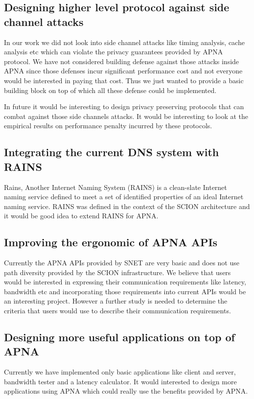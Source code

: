 \subsection{Designing higher level protocol against side channel attacks}
In our work we did not look into side channel attacks like timing analysis, cache analysis etc which can violate the privacy guarantees provided by APNA protocol. We have not considered building defense against those attacks inside APNA since those defenses incur significant performance cost and not everyone would be interested in paying that cost. Thus we just wanted to provide a basic building block on top of which all these defense could be implemented.

In future it would be interesting to design privacy preserving protocols that can combat against those side channels attacks. It would be interesting to look at the empirical results on performance penalty incurred by these protocols.

\subsection{Integrating the current DNS system with RAINS}
Rains, Another Internet Naming System (RAINS) is a clean-slate Internet naming service defined to meet a set of identified properties of an ideal Internet naming service. RAINS was defined in the context of the SCION architecture and it would be good idea to extend RAINS for APNA.

\subsection{Improving the ergonomic of APNA APIs}
Currently the APNA APIs provided by SNET are very basic and does not use path diversity provided by the SCION infrastructure. We believe that users would be interested in expressing their communication requirements like latency, bandwidth etc and incorporating those requirements into current APIs would be an interesting project. However a further study is needed to determine the criteria that users would use to describe their communication requirements. 

\subsection{Designing more useful applications on top of APNA}
Currently we have implemented only basic applications like client and server, bandwidth tester and a latency calculator. It would interested to design more applications using APNA which could really use the benefits provided by APNA.

